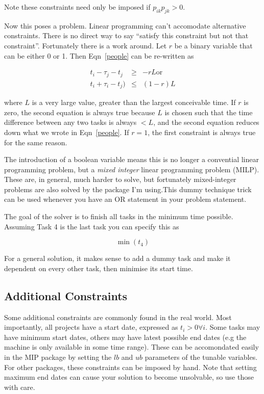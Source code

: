 \documentclass[12pt]{article}
\begin{document}
Note these constraints need only be imposed if $p_{ik}p_{jk} > 0$.

Now this poses a problem. Linear programming can't accomodate alternative constraints. There is no direct way to say ``satisfy this constraint but not that constraint''. Fortunately there is a work around. Let $r$ be a binary variable that can be either 0 or 1. Then Eqn~\ref{people} can be re-written as


\begin{eqnarray}
\label{people2}
t_i - \tau_j  - t_j &\ge& -r L  \mathrm{or}\\
t_i + \tau_i  - t_j) &\le& (1-r) L
\end{eqnarray}

\noindent
where $L$ is a very large value, greater than the largest conceivable time. If $r$ is zero, the second equation is always true because $L$ is chosen such that the time difference between any two tasks is always $<L$, and the second equation reduces down what we wrote in Eqn~\ref{people}. If $r = 1$, the first constraint is always true for the same reason.


The introduction of a boolean variable means this is no longer a convential linear programming problem, but a {\it mixed integer} linear programming problem (MILP). These are, in general, much harder to solve, but fortunately mixed-integer problems are also solved by the package I'm using.This dummy technique trick can be used whenever you have an OR statement in your problem statement.

The goal of the solver is to finish all tasks in the minimum time possible. Assuming Task 4 is the last task you can specify this as 

\begin{equation}
\min(t_4)
\end{equation}

For a general solution, it makes sense to add a dummy task and make it dependent on every other task, then minimise its start time. 

\subsection*{Additional Constraints}
Some additional constraints are commonly found in the real world. Most importantly, all projects have a start date, expressed as $t_i > 0 \forall i$. Some tasks may have minimum start dates, others may have latest possible end dates (e.g the machine is only available in some time range). These can be accomondated easily in the MIP package by setting the $lb$ and $ub$ parameters of the tunable variables. For other packages, these constraints can be imposed by hand.  Note that setting maximum end dates can cause your solution to become unsolvable, so use those with care.
\end{document}
